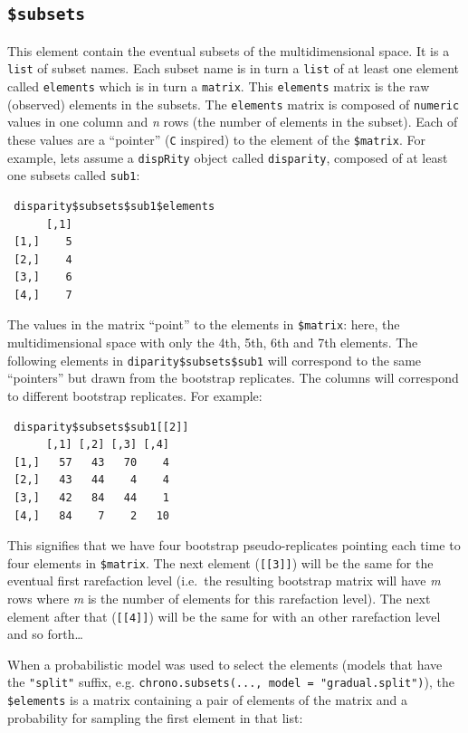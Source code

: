 \documentclass[]{book}
\begin{document}
\hypertarget{subsets}{%
\subsection{\texorpdfstring{\texttt{\$subsets}}{\$subsets}}\label{subsets}}

This element contain the eventual subsets of the multidimensional space.
It is a \texttt{list} of subset names.
Each subset name is in turn a \texttt{list} of at least one element called \texttt{elements} which is in turn a \texttt{matrix}.
This \texttt{elements} matrix is the raw (observed) elements in the subsets.
The \texttt{elements} matrix is composed of \texttt{numeric} values in one column and \emph{n} rows (the number of elements in the subset).
Each of these values are a ``pointer'' (\texttt{C} inspired) to the element of the \texttt{\$matrix}.
For example, lets assume a \texttt{dispRity} object called \texttt{disparity}, composed of at least one subsets called \texttt{sub1}:

\begin{verbatim}
 disparity$subsets$sub1$elements
      [,1]
 [1,]    5
 [2,]    4
 [3,]    6
 [4,]    7
\end{verbatim}

The values in the matrix ``point'' to the elements in \texttt{\$matrix}: here, the multidimensional space with only the 4th, 5th, 6th and 7th elements.
The following elements in \texttt{diparity\$subsets\$sub1} will correspond to the same ``pointers'' but drawn from the bootstrap replicates.
The columns will correspond to different bootstrap replicates.
For example:

\begin{verbatim}
 disparity$subsets$sub1[[2]]
      [,1] [,2] [,3] [,4]
 [1,]   57   43   70    4
 [2,]   43   44    4    4
 [3,]   42   84   44    1
 [4,]   84    7    2   10
\end{verbatim}

This signifies that we have four bootstrap pseudo-replicates pointing each time to four elements in \texttt{\$matrix}.
The next element (\texttt{{[}{[}3{]}{]}}) will be the same for the eventual first rarefaction level (i.e.~the resulting bootstrap matrix will have \emph{m} rows where \emph{m} is the number of elements for this rarefaction level).
The next element after that (\texttt{{[}{[}4{]}{]}}) will be the same for with an other rarefaction level and so forth\ldots{}

When a probabilistic model was used to select the elements (models that have the \texttt{"split"} suffix, e.g. \texttt{chrono.subsets(...,\ model\ =\ "gradual.split")}), the \texttt{\$elements} is a matrix containing a pair of elements of the matrix and a probability for sampling the first element in that list:
\end{document}
